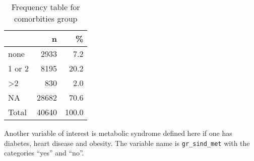 \documentclass[
]{article}
\begin{document}
\begin{table}[!h]

\caption{\label{tab:unnamed-chunk-44}Frequency table for comorbities group}
\centering
\begin{tabular}[t]{l|r|r}
\hline
  & n & \%\\
\hline
none & 2933 & 7.2\\
\hline
1 or 2 & 8195 & 20.2\\
\hline
>2 & 830 & 2.0\\
\hline
NA & 28682 & 70.6\\
\hline
Total & 40640 & 100.0\\
\hline
\end{tabular}
\end{table}

Another variable of interest is metabolic syndrome defined here if one
has diabetes, heart disease and obesity. The variable name is
\texttt{gr\_sind\_met} with the categories ``yes'' and ``no''.
\end{document}
